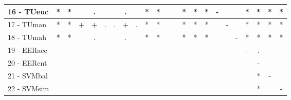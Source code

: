 \begin{table}[h]
\begin{center}
\begin{tabular}{lcc|cc|cc|cc|cc|cc|cc|cc|cc|cc|cc}
16 - TUeuc	& * & * &   & . &   &   & . &   & * & * &   &   & * & * & * & - &   &   & * & * & * & * \\ \hline
17 - TUman	& * & * & + & + & . & . & + & . & * & * &   &   & * & * & * &   & - &   & * & * & * & * \\
18 - TUmah	& * & * &   & . &   &   & . &   & * & * &   &   & * & * & * &   &   & - & * & * & * & * \\ \hline
19 - EERacc	&   &   &   &   &   &   &   &   &   &   &   &   &   &   &   &   &   &   & - & . &   &   \\
20 - EERent	&   &   &   &   &   &   &   &   &   &   &   &   &   &   &   &   &   &   &   & - &   &   \\ \hline
21 - SVMbal	&   &   &   &   &   &   &   &   &   &   &   &   &   &   &   &   &   &   &   & * & - &   \\
22 - SVMsim	&   &   &   &   &   &   &   &   &   &   &   &   &   &   &   &   &   &   &   & * &   & - \\ \hline\end{tabular}

\label{stratsfriedCIELM}
\end{center}
\end{table}